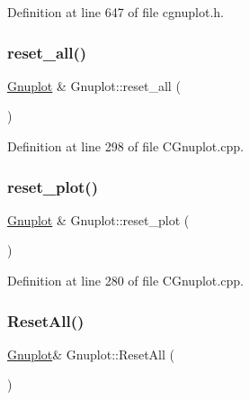 Definition at line 647 of file cgnuplot.\+h.

\mbox{\label{class_gnuplot_a9aedfe8371083a1a3ac2b9493810049c}} 
\subsubsection{\texorpdfstring{reset\+\_\+all()}{reset\_all()}}
{\footnotesize\ttfamily \hyperlink{class_gnuplot}{Gnuplot} \& Gnuplot\+::reset\+\_\+all (\begin{DoxyParamCaption}{ }\end{DoxyParamCaption})}



Definition at line 298 of file C\+Gnuplot.\+cpp.

\mbox{\label{class_gnuplot_a6797761712d3c311e3685bcccba65dd4}} 
\subsubsection{\texorpdfstring{reset\+\_\+plot()}{reset\_plot()}}
{\footnotesize\ttfamily \hyperlink{class_gnuplot}{Gnuplot} \& Gnuplot\+::reset\+\_\+plot (\begin{DoxyParamCaption}{ }\end{DoxyParamCaption})}



Definition at line 280 of file C\+Gnuplot.\+cpp.

\mbox{\label{class_gnuplot_ae9e88b397cc6ddd052f6378a58373b0c}} 
\subsubsection{\texorpdfstring{Reset\+All()}{ResetAll()}}
{\footnotesize\ttfamily \hyperlink{class_gnuplot}{Gnuplot}\& Gnuplot\+::\+Reset\+All (\begin{DoxyParamCaption}{ }\end{DoxyParamCaption})\hspace{0.3cm}{\ttfamily [inline]}}



